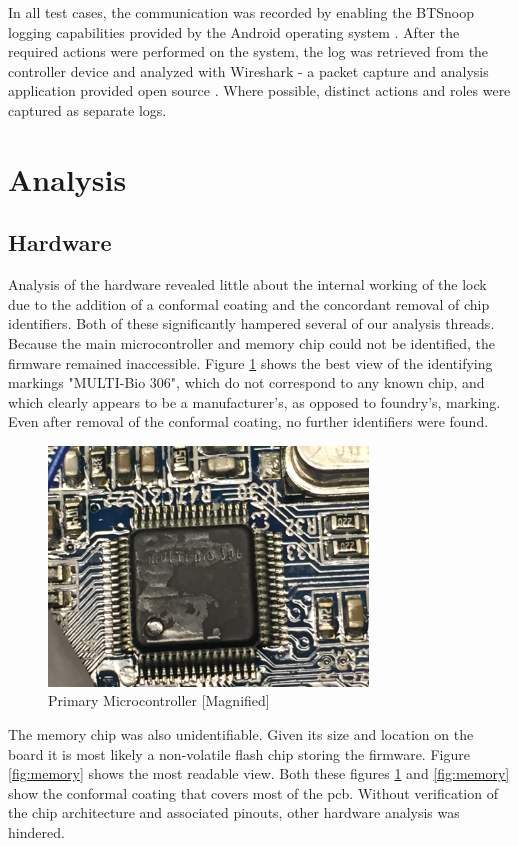 \documentclass[conference]{IEEEtran}
\begin{document}
\bigskip

In all test cases, the communication was recorded by enabling the BTSnoop logging capabilities provided by the Android operating system \cite{AndroidDevelopers}.  After the required actions were performed on the system, the log was retrieved from the controller device and analyzed with Wireshark - a packet capture and analysis application provided open source \cite{Sharpe}.  Where possible, distinct actions and roles were captured as separate logs.


\section{Analysis}
\subsection{Hardware}

Analysis of the hardware revealed little about the internal working of the lock due to the addition of a conformal coating and the concordant removal of chip identifiers. Both of these significantly hampered several of our analysis threads. Because the main microcontroller and memory chip could not be identified, the firmware remained inaccessible. Figure \ref{fig:ChipText} shows the best view of the identifying markings "MULTI-Bio 306", which do not correspond to any known chip, and which clearly appears to be a manufacturer's, as opposed to foundry's, marking. Even after removal of the conformal coating, no further identifiers were found.  

\begin{figure}[ht]
  \includegraphics[width=8.5cm]{images/MainChipText.JPG}
  \caption{Primary Microcontroller [Magnified]}
  \label{fig:ChipText}
\end{figure}

The memory chip was also unidentifiable.  Given its size and location on the board it is most likely a non-volatile flash chip storing the firmware.  Figure \ref{fig:memory} shows the most readable view. Both these figures \ref{fig:ChipText} and \ref{fig:memory} show the conformal coating that covers most of the \gls{pcb}. Without verification of the chip architecture and associated pinouts, other hardware analysis was hindered. 
\end{document}
